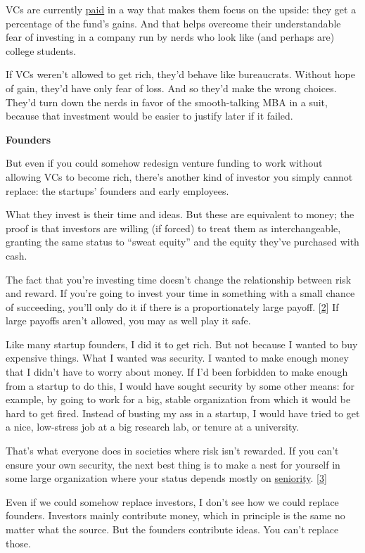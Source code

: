 VCs are currently \href{venturecapital.html}{paid} in a way that makes
them focus on the upside: they get a percentage of the fund's gains. And
that helps overcome their understandable fear of investing in a company
run by nerds who look like (and perhaps are) college students.

If VCs weren't allowed to get rich, they'd behave like bureaucrats.
Without hope of gain, they'd have only fear of loss. And so they'd make
the wrong choices. They'd turn down the nerds in favor of the
smooth-talking MBA in a suit, because that investment would be easier to
justify later if it failed.

\textbf{Founders}

But even if you could somehow redesign venture funding to work without
allowing VCs to become rich, there's another kind of investor you simply
cannot replace: the startups' founders and early employees.

What they invest is their time and ideas. But these are equivalent to
money; the proof is that investors are willing (if forced) to treat them
as interchangeable, granting the same status to ``sweat equity'' and the
equity they've purchased with cash.

The fact that you're investing time doesn't change the relationship
between risk and reward. If you're going to invest your time in
something with a small chance of succeeding, you'll only do it if there
is a proportionately large payoff. {[}\hyperref[f2n]{2}{]} If large
payoffs aren't allowed, you may as well play it safe.

Like many startup founders, I did it to get rich. But not because I
wanted to buy expensive things. What I wanted was security. I wanted to
make enough money that I didn't have to worry about money. If I'd been
forbidden to make enough from a startup to do this, I would have sought
security by some other means: for example, by going to work for a big,
stable organization from which it would be hard to get fired. Instead of
busting my ass in a startup, I would have tried to get a nice,
low-stress job at a big research lab, or tenure at a university.

That's what everyone does in societies where risk isn't rewarded. If you
can't ensure your own security, the next best thing is to make a nest
for yourself in some large organization where your status depends mostly
on \href{ladder.html}{seniority}. {[}\hyperref[f3n]{3}{]}

Even if we could somehow replace investors, I don't see how we could
replace founders. Investors mainly contribute money, which in principle
is the same no matter what the source. But the founders contribute
ideas. You can't replace those.

